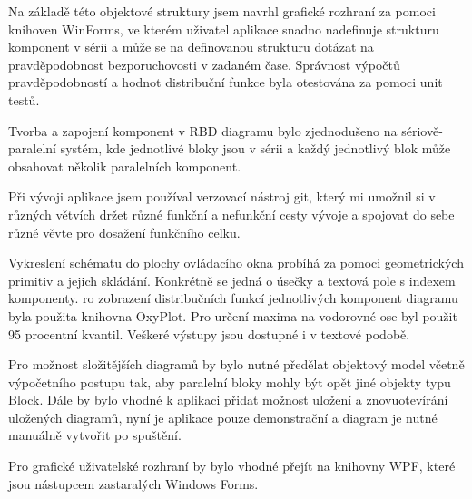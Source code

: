 \documentclass[FM,RP]{tulthesis}
\begin{document}
    Na základě této objektové struktury jsem navrhl grafické rozhraní za pomoci knihoven WinForms, 
    ve kterém uživatel aplikace snadno nadefinuje strukturu komponent v sérii a může se na definovanou strukturu dotázat
    na pravděpodobnost bezporuchovosti v zadaném čase. 
    Správnost výpočtů pravděpodobností a hodnot distribuční funkce byla otestována za pomoci unit testů.

    Tvorba a zapojení komponent v RBD diagramu bylo zjednodušeno na sériově-paralelní systém, kde jednotlivé bloky jsou v sérii 
    a každý jednotlivý blok může obsahovat několik paralelních komponent.

    Při vývoji aplikace jsem používal verzovací nástroj git, který mi umožnil si v různých větvích držet různé funkční a nefunkční cesty vývoje a spojovat do sebe různé
    věvte pro dosažení funkčního celku. \cite{7}

    Vykreslení schématu do plochy ovládacího okna probíhá za pomoci geometrických primitiv a jejich skládání. 
    Konkrétně se jedná o úsečky a textová pole s indexem komponenty.
    ro zobrazení distribučních funkcí jednotlivých komponent diagramu byla použita knihovna OxyPlot. 
    Pro určení maxima na vodorovné ose byl použit 95 procentní kvantil.
    Veškeré výstupy jsou dostupné i v textové podobě.

    Pro možnost složitějších diagramů by bylo nutné předělat objektový model včetně výpočetního postupu tak, aby paralelní bloky mohly být opět jiné objekty typu Block.
    Dále by bylo vhodné k aplikaci přidat možnost uložení a znovuotevírání uložených diagramů,
    nyní je aplikace pouze demonstrační a diagram je nutné manuálně vytvořit po spuštění.

    Pro grafické uživatelské rozhraní by bylo vhodné přejít na knihovny WPF, které jsou nástupcem zastaralých Windows Forms.
\end{document}
